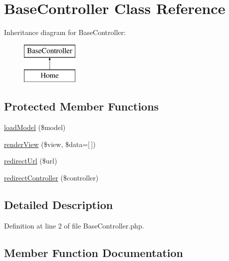 \hypertarget{class_base_controller}{}\section{Base\+Controller Class Reference}
\label{class_base_controller}
Inheritance diagram for Base\+Controller\+:\begin{figure}[H]
\begin{center}
\leavevmode
\includegraphics[height=2.000000cm]{class_base_controller}
\end{center}
\end{figure}
\subsection*{Protected Member Functions}
\begin{DoxyCompactItemize}
\item 
\hyperlink{class_base_controller_a31925ff6c6c23e4015d45a44c78a461b}{load\+Model} (\$model)
\item 
\hyperlink{class_base_controller_a2baad3faf609bcd81f81cf8e9713ec01}{render\+View} (\$view, \$data=\mbox{[}$\,$\mbox{]})
\item 
\hyperlink{class_base_controller_a73ab7b9209ca7fd12d9f8d2114c1c825}{redirect\+Url} (\$url)
\item 
\hyperlink{class_base_controller_ad16dba8468d26e5ec0f30a415af257c0}{redirect\+Controller} (\$controller)
\end{DoxyCompactItemize}


\subsection{Detailed Description}


Definition at line 2 of file Base\+Controller.\+php.



\subsection{Member Function Documentation}
\hypertarget{class_base_controller_a31925ff6c6c23e4015d45a44c78a461b}{}\label{class_base_controller_a31925ff6c6c23e4015d45a44c78a461b} 
